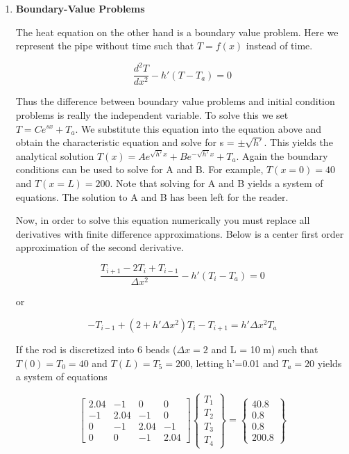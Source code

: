 \begin{enumerate}

  \item {\bf Boundary-Value Problems}\label{s:heat1D}

    The heat equation on the other hand is a boundary value problem. Here we
    represent the pipe without time such that $T = f(x)$ instead of
    time. 

    \begin{equation} 
      \frac{d^2 T}{d x^2} - h'(T-T_a) = 0
    \end{equation}
    
    Thus the difference between boundary value problems and initial
    condition problems is really the independent variable. To solve
    this we set $T = Ce^{sx}+T_a$. We substitute this equation into 
    the equation above and obtain the characteristic equation and
    solve for s = $\pm\sqrt{h'}$. This yields the analytical solution
    $T(x) = A e^{\sqrt{h'}x} + B e^{-\sqrt{h'}x} + T_a$. Again the boundary
    conditions can be used to solve for A and B. For example, $T(x=0)
    = 40$ and $T(x=L) = 200$. Note that solving for A and B yields a
    system of equations. The solution to A and B has been left for the
    reader. 

    Now, in order to solve this equation numerically you must replace
    all derivatives with finite difference approximations. Below is a
    center first order approximation of the second derivative.

    \begin{equation}
      \frac{T_{i+1} - 2T_i + T_{i-1}}{\Delta x^2} - h'(T_i-T_a) = 0
    \end{equation}

    or

    \begin{equation}
      -T_{i-1} + (2+h'\Delta x^2)T_i - T_{i+1} = h'\Delta x^2 T_a
    \end{equation}

    If the rod is discretized into 6 beads ($\Delta x = 2$ and L = 10
    m) such that $T(0) = T_0 = 40$ and $T(L) = T_5 = 200$, letting
    h'=0.01 and $T_a = 20$ yields a system of equations

    \begin{equation}
      \begin{bmatrix} 2.04 & -1 & 0 & 0 \\ -1 & 2.04 & -1 & 0 \\ 0 &
        -1 & 2.04 & -1 \\ 0 & 0 & -1 &
        2.04\end{bmatrix} \begin{Bmatrix} T_1 \\ T_2 \\ T_3
          \\ T_4 \end{Bmatrix} = \begin{Bmatrix} 40.8 \\ 0.8 \\ 0.8
          \\ 200.8 \end{Bmatrix}
    \end{equation}


\end{enumerate}
